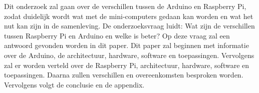 \documentclass[a4paper, dutch]{scrartcl}
\begin{document}
Dit onderzoek zal gaan over de verschillen tussen de Arduino en Raspberry Pi, zodat duidelijk wordt
wat met de mini-computers gedaan kan worden en wat het nut kan zijn in de samenleving.
De onderzoeksvraag luidt: Wat zijn de verschillen tussen Raspberry Pi en Arduino en welke is beter?
Op deze vraag zal een antwoord gevonden worden in dit paper.
Dit paper zal beginnen met informatie over de Arduino, de architectuur, hardware, software en
toepassingen.
Vervolgens zal er worden verteld over de Raspberry Pi, architectuur, hardware, software en
toepassingen.
Daarna zullen verschillen en overeenkomsten besproken worden.
Vervolgens volgt de conclusie en de appendix.




\printbibliography
\end{document}
